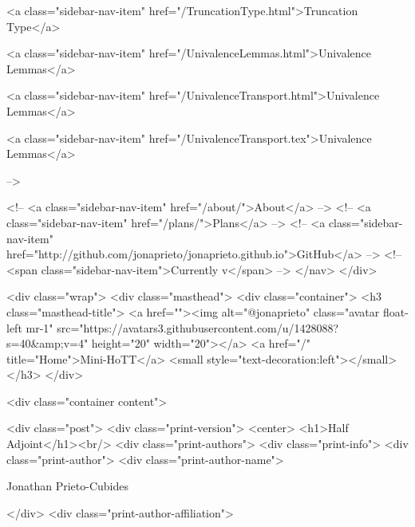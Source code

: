       
    
      
        
          <a class="sidebar-nav-item" href="/TruncationType.html">Truncation Type</a>
        
      
    
      
        
          <a class="sidebar-nav-item" href="/UnivalenceLemmas.html">Univalence Lemmas</a>
        
      
    
      
        
          <a class="sidebar-nav-item" href="/UnivalenceTransport.html">Univalence Lemmas</a>
        
      
    
      
        
          <a class="sidebar-nav-item" href="/UnivalenceTransport.tex">Univalence Lemmas</a>
        
      
     -->

    <!-- <a class="sidebar-nav-item" href="/about/">About</a> -->
    <!-- <a class="sidebar-nav-item" href="/plans/">Plans</a> -->
    <!-- <a class="sidebar-nav-item" href="http://github.com/jonaprieto/jonaprieto.github.io">GitHub</a> -->
    <!-- <span class="sidebar-nav-item">Currently v</span> -->
  </nav>
</div>

    <div class="wrap">
      <div class="masthead">
        <div class="container">
          <h3 class="masthead-title">
            <a href=""><img alt="@jonaprieto" class="avatar float-left mr-1" src="https://avatars3.githubusercontent.com/u/1428088?s=40&amp;v=4" height="20" width="20"></a>
            <a href="/" title="Home">Mini-HoTT</a>
            <small style="text-decoration:left"></small>
          </h3>
        </div>
      
      <div class="container content">
        







<div class="post">
  <div class="print-version">
    <center>
      <h1>Half Adjoint</h1><br/>
        <div class="print-authors">
          <div class="print-info">
            <div class="print-author">
              <div class="print-author-name">
                
                  Jonathan Prieto-Cubides
                
              </div>
              <div class="print-author-affiliation">
                
